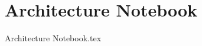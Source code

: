 \documentclass[a4paper,11pt]{book}
\begin{document}
\chapter{Architecture Notebook}
{Architecture Notebook.tex}
\end{document}
